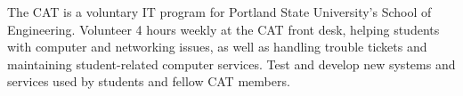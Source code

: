 {
    The CAT is a voluntary IT program for Portland State University's School of Engineering. Volunteer 4 hours weekly at the CAT front desk, helping students with computer and networking issues, as well as handling trouble tickets and maintaining student-related computer services. Test and develop new systems and services used by students and fellow CAT members.
}
